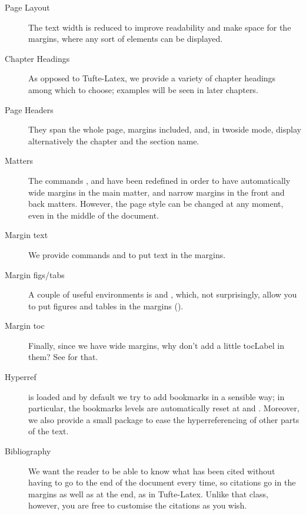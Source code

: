 \begin{description}
	\item[Page Layout] The text width is reduced to improve readability 
	and make space for the margins, where any sort of elements can be 
	displayed.
	\item[Chapter Headings] As opposed to Tufte-Latex, we provide a 
	variety of chapter headings among which to choose; examples will be 
	seen in later chapters.
	\item[Page Headers] They span the whole page, margins included, and, 
	in twoside mode, display alternatively the chapter and the section 
	name.
	\item[Matters] The commands , 
	 and  have been redefined in 
	order to have automatically wide margins in the main matter, and 
	narrow margins in the front and back matters. However, the page 
	style can be changed at any moment, even in the middle of the 
	document.
	\item[Margin text] We provide commands  and 
	 to put text in the 
	margins.
	\item[Margin figs/tabs] A couple of useful environments is 
	 and , which, not 
	surprisingly, allow you to put figures and tables in the margins 
	(\cfr {}).
	\item[Margin toc] Finally, since we have wide margins, why don't add 
	a little \acrfull{tocLabel} in them? See  for 
	that.
	\item[Hyperref]  is loaded and by default we try 
	to add bookmarks in a sensible way; in particular, the bookmarks 
	levels are automatically reset at  and 
	. Moreover, we also provide a small package to 
	ease the hyperreferencing of other parts of the text.
	\item[Bibliography] We want the reader to be able to know what has 
	been cited without having to go to the end of the document every 
	time, so citations go in the margins as well as at the end, as in 
	Tufte-Latex. Unlike that class, however, you are free to customise 
	the citations as you wish.
\end{description}

